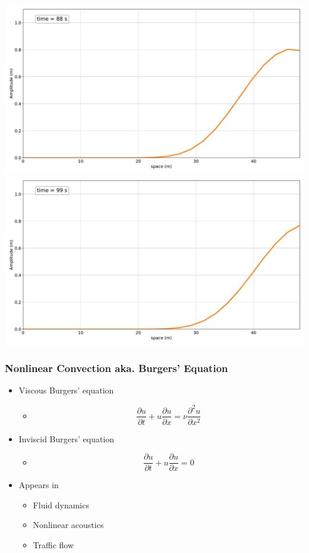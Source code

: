   \includegraphics[width=\linewidth]{../BurgersEquation/images/Linear_Convection8.pdf}
  \includegraphics[width=\linewidth]{../BurgersEquation/images/Linear_Convection9.pdf}


\begin{frame}
  \frametitle{Nonlinear Convection aka. Burgers' Equation}
\begin{itemize}
  \item<1->   Viscous Burgers' equation
  \begin{itemize}
    \item $$
    \frac {\partial u}{\partial t}+u{\frac {\partial u}{\partial x}}=\nu {\frac {\partial ^{2}u}{\partial x^{2}}}
    $$
  \end{itemize}
  \item<2-> Inviscid Burgers' equation
  \begin{itemize}
    \item $$
    \frac {\partial u}{\partial t}+u{\frac {\partial u}{\partial x}}=0
    $$
  \end{itemize}
  \item<3-> Appears in
  \begin{itemize}
    \item Fluid dynamics
    \item Nonlinear acoustics
    \item Traffic flow
  \end{itemize}
\end{itemize}
\end{frame}

